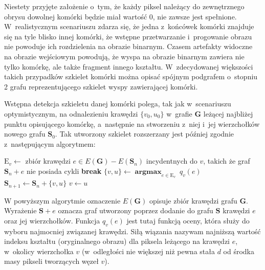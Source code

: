 \documentclass[declaration,shortabstract,mgr]{iithesis}
\DeclareMathOperator*{\argmax}{\textbf{argmax}}
\begin{document}
Niestety przyjęte założenie o~tym, że każdy piksel należący do zewnętrznego obrysu dowolnej komórki będzie miał wartość $0$, nie zawsze jest spełnione. W~realistycznym scenariuszu zdarza się, że jedna z~końcówek komórki znajduje się na tyle blisko innej komórki, że wstępne przetwarzanie i~progowanie obrazu nie powoduje ich rozdzielenia na obrazie binarnym. Czasem artefakty widoczne na obrazie wejściowym powodują, że wyspa na obrazie binarnym zawiera nie tylko komórkę, ale także fragment innego kształtu. W~zdecydowanej większości takich przypadków szkielet komórki można opisać spójnym podgrafem o~stopniu 2 grafu reprezentującego szkielet wyspy zawierającej komórki.

Wstępna detekcja szkieletu danej komórki polega, tak jak w~scenariuszu optymistycznym, na odnalezieniu krawędzi $\{v_0, u_0\}$ w~grafie $\mathbf{G}$ leżącej najbliżej punktu opisującego komórkę, a~następnie na stworzeniu z~niej i~jej wierzchołków nowego grafu $\mathbf{S}_0$. Tak utworzony szkielet rozszerzany jest później zgodnie z~następującym algorytmem:

\par\bigskip
\begin{algorithmic}
  \LOOP
    \STATE
      $\text{E}_v \gets$ zbiór krawędzi $e \in E(\mathbf{G}) - E(\mathbf{S}_n)$ incydentnych do $v$,\newline
       takich że graf $\mathbf{S}_n + e$ nie posiada cykli
      \STATE \textbf{break}
    \ENDIF
    \STATE $\{v, u\} \gets \argmax_{e \in \text{E}_v} \ q_v(e)$
    \STATE $\mathbf{S}_{n+1} \gets \mathbf{S}_n + \{v, u\} $
    \STATE $v \gets u$
  \ENDLOOP
\ENDFOR
\end{algorithmic}
\par\bigskip

\noindent
W powyższym algorytmie oznaczenie $E(\mathbf{G})$ opisuje zbiór krawędzi grafu $\mathbf{G}$.
Wyrażenie $\mathbf{S} + e$ oznacza graf utworzony poprzez dodanie do grafu $\mathbf{S}$ krawędzi $e$ oraz jej wierzchołków.
Funkcja $q_v(e)$ jest tutaj funkcją oceny, która służy do wyboru najmocniej związanej krawędzi. Siłą wiązania nazywam najniższą wartość indeksu kształtu (oryginalnego obrazu) dla piksela leżącego na krawędzi $e$, w~okolicy wierzchołka $v$ (w~odległości nie większej niż pewna stała $d$ od środka masy pikseli tworzących węzeł $v$).
\end{document}
